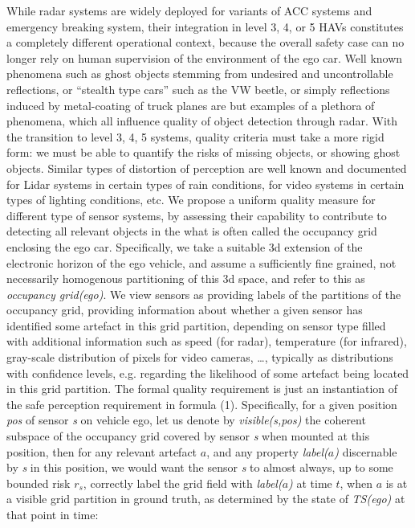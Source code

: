 While radar systems are widely deployed for variants of ACC systems and emergency breaking system, their integration in level 3, 4, or 5 HAVs constitutes a completely different operational context, because the overall safety case can no longer rely on human supervision of the environment of the ego car. Well known phenomena such as ghost objects stemming from undesired and uncontrollable reflections, or \enquote{stealth type cars} such as the VW beetle, or simply reflections induced by metal-coating of truck planes are but examples of a plethora of phenomena, which all influence quality of object detection through radar. With the transition to level 3, 4, 5 systems, quality criteria must take a more rigid form: we must be able to quantify the risks of missing objects, or showing ghost objects. Similar types of distortion of perception are well known and documented for Lidar systems in certain types of rain conditions, for video systems in certain types of lighting conditions, etc. We propose a uniform quality measure for different type of sensor systems, by assessing their capability to contribute to detecting all relevant objects in the what is often called the occupancy grid enclosing the ego car. Specifically, we take a suitable 3d extension of the electronic horizon of the ego vehicle, and assume a sufficiently fine grained, not necessarily homogenous partitioning of this 3d space, and refer to this as \emph{occupancy grid(ego)}. We view sensors as providing labels of the partitions of the occupancy grid, providing information about whether a given sensor has identified some artefact in this grid partition, depending on sensor type filled with additional information such as speed (for radar), temperature (for infrared), gray-scale distribution of pixels for video cameras, \ldots, typically as distributions with confidence levels, e.g. regarding the likelihood of some artefact being located in this grid partition. The formal quality requirement is just an instantiation of the safe perception requirement in formula (1). Specifically, for a given position \textit{pos}  of sensor  \textit{s}  on vehicle ego, let us denote by \textit{visible(s,pos)} the coherent subspace of the occupancy grid covered by sensor \textit{s} when mounted at this position, then for any relevant artefact  $a$, and any property  \textit{label($a$)} discernable by  \textit{s}  in this position, we would want the sensor \textit{s} to almost always, up to some bounded risk $r_s$, correctly label the grid field with \textit{label($a$)} at time $t$, when $a$ is at a visible grid partition in ground truth, as determined by the state of \textit{TS(ego)} at that point in time:

